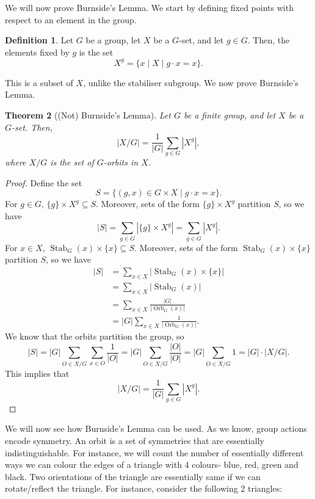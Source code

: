 \documentclass[a4paper, openany]{memoir}
\theoremstyle{definition}
\newtheorem{definition}{Definition}[section]
\theoremstyle{plain}
\newtheorem{theorem}[definition]{Theorem}
\begin{document}
We will now prove Burnside's Lemma. We start by defining fixed points with respect to an element in the group.
\begin{definition}
Let $G$ be a group, let $X$ be a $G$-set, and let $g \in G$. Then, the elements fixed by $g$ is the set
\[X^g = \{x \mid X \mid g \cdot x = x\}.\]
\end{definition}
\noindent This is a subset of $X$, unlike the stabiliser subgroup. We now prove Burnside's Lemma.
\begin{theorem}[(Not) Burnside's Lemma]
Let $G$ be a finite group, and let $X$ be a $G$-set. Then,
\[|X/G| = \frac{1}{|G|} \sum_{g \in G} |X^g|,\]
where $X/G$ is the set of $G$-orbits in $X$.
\end{theorem}
\begin{proof}
Define the set
\[S = \{(g, x) \in G \times X \mid g \cdot x = x\}.\]
For $g \in G$, $\{g\} \times X^g \subseteq S$. Moreover, sets of the form $\{g\} \times X^g$ partition $S$, so we have
\[|S| = \sum_{g \in G} |\{ g \} \times X^g| = \sum_{g \in G} |X^g|.\]
For $x \in X$, $\operatorname{Stab}_G(x) \times \{x\} \subseteq S$. Moreover, sets of the form $\operatorname{Stab}_G(x) \times \{x\}$ partition $S$, so we have
\begin{align*}
    |S| &= \sum_{x \in X} |\operatorname{Stab}_G(x) \times \{x\}| \\
    &= \sum_{x \in X} |\operatorname{Stab}_G(x)| \\
    &= \sum_{x \in X} \frac{|G|}{|\operatorname{Orb}_G(x)|} \\
    &= |G| \sum_{x \in X} \frac{1}{|\operatorname{Orb}_G(x)|}.
\end{align*}
We know that the orbits partition the group, so
\[|S| = |G| \sum_{O \in X/G} \sum_{x \in O} \frac{1}{|O|} = |G| \sum_{O \in X/G} \frac{|O|}{|O|} = |G| \sum_{O \in X/G} 1 = |G| \cdot |X/G|.\]
This implies that
\[|X/G| = \frac{1}{|G|} \sum_{g \in G} |X^g|.\]
\end{proof}
\noindent We will now see how Burnside's Lemma can be used. As we know, group actions encode symmetry. An orbit is a set of symmetries that are essentially indistinguishable. For instance, we will count the number of essentially different ways we can colour the edges of a triangle with 4 colours- blue, red, green and black. Two orientations of the triangle are essentially same if we can rotate/reflect the triangle. For instance, consider the following 2 triangles:
\end{document}
